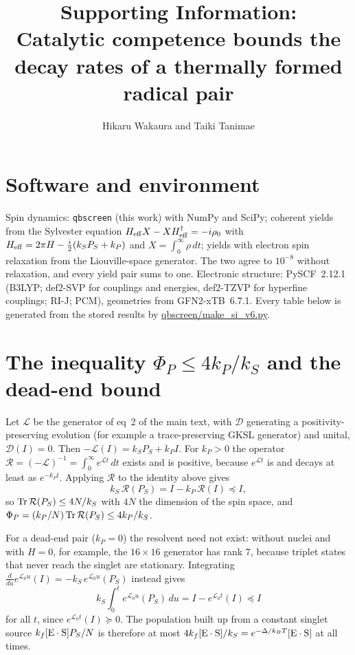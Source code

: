 \documentclass[11pt]{article}
\title{Supporting Information:\\ Catalytic competence bounds the decay rates of
a thermally formed radical pair}
\author{Hikaru Wakaura and Taiki Tanimae}
\date{}
\begin{document}
\maketitle

\section{Software and environment}
Spin dynamics: \texttt{qbscreen} (this work) with NumPy and SciPy; coherent
yields from the Sylvester equation
$H_{\rm eff}X - XH_{\rm eff}^\dagger = -i\rho_0$ with
$H_{\rm eff} = 2\pi H - \tfrac{i}{2}(k_SP_S + k_P)$ and $X = \int_0^\infty\rho\,dt$;
yields with electron spin relaxation from the Liouville-space generator. The two
agree to $10^{-8}$ without relaxation, and every yield pair sums to one.
Electronic structure: PySCF~2.12.1 (B3LYP; def2-SVP for couplings and energies,
def2-TZVP for hyperfine couplings; RI-J; PCM), geometries from GFN2-xTB~6.7.1.
Every table below is generated from the stored results by
\url{qbscreen/make_si_v6.py}.

\section{The inequality $\Phi_P\le4k_P/k_S$ and the dead-end bound}
Let $\mathcal L$ be the generator of eq~2 of the main text, with $\mathcal D$
generating a positivity-preserving evolution (for example a trace-preserving
GKSL generator) and unital, $\mathcal D(I)=0$. Then
$-\mathcal L(I) = k_SP_S + k_PI$. For $k_P>0$ the operator
$\mathcal R = (-\mathcal L)^{-1} = \int_0^\infty e^{\mathcal Lt}\,dt$ exists and
is positive, because $e^{\mathcal Lt}$ is and decays at least as $e^{-k_Pt}$.
Applying $\mathcal R$ to the identity above gives
\begin{equation}
k_S\,\mathcal R(P_S) = I - k_P\,\mathcal R(I) \preceq I ,
\end{equation}
so ${\rm Tr}\,\mathcal R(P_S)\le 4N/k_S$ with $4N$ the dimension of the spin
space, and $\Phi_P = (k_P/N)\,{\rm Tr}\,\mathcal R(P_S)\le4k_P/k_S$.

For a dead-end pair ($k_P=0$) the resolvent need not exist: without nuclei and
with $H=0$, for example, the $16\times16$ generator has rank 7, because triplet
states that never reach the singlet are stationary. Integrating
$\frac{d}{du}e^{\mathcal L_0u}(I) = -k_S\,e^{\mathcal L_0u}(P_S)$ instead gives
\begin{equation}
k_S\int_0^t e^{\mathcal L_0u}(P_S)\,du = I - e^{\mathcal L_0t}(I) \preceq I
\end{equation}
for all $t$, since $e^{\mathcal L_0t}(I)\succeq0$. The population built up from a
constant singlet source $k_f[{\rm E\cdot S}]P_S/N$ is therefore at most
$4k_f[{\rm E\cdot S}]/k_S = e^{-\Delta/k_BT}[{\rm E\cdot S}]$ at all times.
\end{document}
